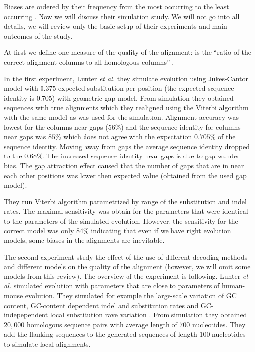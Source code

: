 Biases are ordered by their frequency from the most occurring to the least
occurring \cite{Lunter2008}. Now we will discuss their simulation study. We will
not go into all details, we will review only the basic setup of their
experiments and main outcomes of the study.

At first we define one measure of the quality of the alignment:
 is the ``ratio of the correct alignment columns to all
homologous columns'' \cite{Lunter2008}. 

In the first experiment, Lunter {\it et al.} they
simulate evolution using Jukes-Cantor model with $0.375$ expected substitution
per position (the expected sequence identity is $0.705$) with geometric gap
model. From simulation they obtained sequences with true alignments which they
realigned using the Viterbi algorithm with the same model as was used for the
simulation. Alignment accuracy was lowest for the  columns near gaps ($56$\%)
and the sequence identity for columns near gaps was $85$\% which does not agree
with the expectation  $0.705$\% of the sequence identity. Moving away from gaps
the average sequence identity dropped to the $0.68$\%. The increased sequence
identity near gaps is due to gap wander bias. The gap attraction effect caused
that the number of gaps that are in near each other positions was lower then
expected value (obtained from the used gap model).

They run Viterbi algorithm parametrized by range of the substitution and indel
rates. The maximal sensitivity was obtain for the parameters that were identical
to the parameters of the simulated evolution. However, the sensitivity for the
correct model was only $84$\% indicating that even if we have right evolution
models, some biases in the alignments are inevitable.  

The second experiment study the effect of the use of different decoding methods
and different models on the quality of the alignment (however, we will omit some
models from this review).  The overview of the experiment is following.  Lunter
{\it et al.\nocite{Lunter2008}} simulated evolution with parameters that are
close to parameters of human-mouse evolution. They simulated for example the
large-scale variation of GC content, GC-content dependent indel and substitution
rates and GC-indepependent local substitution rave variation \cite{Lunter2008}.
From simulation they obtained $20,000$ homologous sequence pairs with average
length of $700$ nucleotides. They add the flanking sequences to the generated
sequences of length $100$ nucleotides to simulate local alignments.

